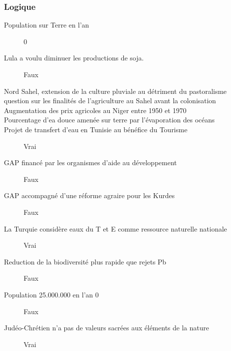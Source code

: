 \subsubsection{Logique}
\begin{description}
	\item [Population sur Terre en l'an]
    \color{cyan}0\color{black}
	
    \item [Lula a voulu diminuer les productions de soja.]
    \color{cyan}Faux\color{black}
    
	\item [Nord Sahel, extension de la culture pluviale au détriment du pastoralisme]
    \color{cyan}\color{black}
    
	\item [question sur les finalités de l'agriculture au Sahel avant la colonisation]
    \color{cyan}\color{black}
	
    \item [Augmentation des prix agricoles au Niger entre 1950 et 1970]
    \color{cyan}\color{black}
    
	\item [Pourcentage d'ea douce amenée sur terre par l'évaporation des océans]
    \color{cyan}\color{black}
    
	\item [Projet de transfert d'eau en Tunisie au bénéfice du Tourisme]
    \color{cyan}Vrai\color{black}
    
	\item [GAP financé par les organismes d'aide au développement]
    \color{cyan}Faux\color{black}
    
	\item [GAP accompagné d'une réforme agraire pour les Kurdes]
    \color{cyan}Faux\color{black}
    
	\item [La Turquie considère eaux du T et E comme ressource naturelle nationale]
    \color{cyan}Vrai\color{black}
    
	\item [Reduction de la biodiversité plus rapide que rejets Pb]
    \color{cyan}Faux\color{black}
    
	\item [Population 25.000.000 en l'an 0]
    \color{cyan}Faux\color{black}
    
	\item [Judéo-Chrétien n'a pas de valeurs sacrées aux éléments de la nature]
    \color{cyan}Vrai\color{black}
    

\end{description}
